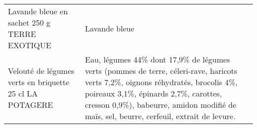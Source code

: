 \begin{longtable}{p{5cm}p{10cm}}
                                                             Lavande bleue en sachet 250 g TERRE EXOTIQUE &                                                                                                                                                                                                                                                                                                                                                                                                                                                                                                                                                                                                                                                                                                                                                                                                                                                                                                                                                                                                                            Lavande bleue \\
                                                  Velouté de légumes verts en briquette 25 cl LA POTAGERE &                                                                                                                                                                                                                                                                                                                                                                                                                                                                                                                                                                                                                                                                                                                                                                     Eau, légumes 44\% dont 17,9\% de légumes verts (pommes de terre, céleri-rave, haricots verts 7,2\%, oignons réhydratés, brocolis 4\%, poireaux 3,1\%, épinards 2,7\%, carottes, cresson 0,9\%), babeurre, amidon modifié de maïs, sel, beurre, cerfeuil, extrait de levure. \\

\end{longtable}
